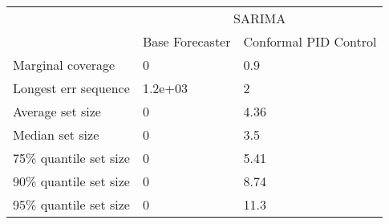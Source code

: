 \begin{tabular}{lll}
\toprule
& \multicolumn{2}{c}{SARIMA} \\
& Base Forecaster & Conformal PID Control \\
\midrule
Marginal coverage & 0 & 0.9 \\
Longest err sequence & 1.2e+03 & 2 \\
Average set size & 0 & 4.36 \\
Median set size & 0 & 3.5 \\
75\% quantile set size & 0 & 5.41 \\
90\% quantile set size & 0 & 8.74 \\
95\% quantile set size & 0 & 11.3 \\
\bottomrule
\end{tabular}
